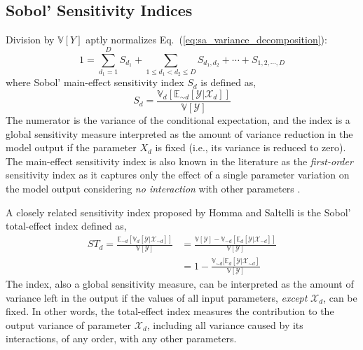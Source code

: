 \subsection{Sobol' Sensitivity Indices}\label{sub:sa_sobol_indices}

Division by $\mathbb{V}[Y]$ aptly normalizes Eq.~(\ref{eq:sa_variance_decomposition}):
\begin{equation}
  1 = \sum_{d_1 = 1}^{D} S_{d_1} + \sum_{1 \leq d_1 < d_2 \leq D} S_{d_1,d_2} + \cdots + S_{1,2,\cdots,D}
\label{eq:sa_normalized_variance}
\end{equation}
where Sobol' main-effect sensitivity index $S_d$ is defined as,
\begin{equation}
  S_d = \frac{\mathbb{V}_d [\mathbb{E}_{\sim d} [\mathcal{Y}|\mathcal{X}_d]]}{\mathbb{V}[\mathcal{Y}]}
\label{eq:sa_main_effect_index}
\end{equation}
The numerator is the variance of the conditional expectation,
and the index is a global sensitivity measure interpreted as the amount of variance reduction in the model output if the parameter $X_d$ is fixed (i.e., its variance is reduced to zero).
The main-effect sensitivity index is also known in the literature as the \emph{first-order} sensitivity index 
as it captures only the effect of a single parameter variation on the model output considering \emph{no interaction} with other parameters \cite{Saltelli2002}.

A closely related sensitivity index proposed by Homma and Saltelli \cite{Homma1996} is the Sobol' total-effect index defined as,
\begin{equation}
  \begin{split}
    ST_{d} = \frac{\mathbb{E}_{\sim d}[\mathbb{V}_{d}[\mathcal{Y}|\bm{\mathcal{X}}_{\sim d}]]}{\mathbb{V}[\mathcal{Y}]}
           & = \frac{\mathbb{V}[\mathcal{Y}] - \mathbb{V}_{\sim d}\left[\mathbb{E}_{d}\left[\mathcal{Y}|\bm{\mathcal{X}}_{\sim d}\right]\right]}{\mathbb{V}[\mathcal{Y}]} \\
           & = 1 - \frac{\mathbb{V}_{\sim d}[\mathbb{E}_{d}[\mathcal{Y}|\bm{\mathcal{X}}_{\sim d}]}{\mathbb{V}[\mathcal{Y}]}
  \end{split}
\label{eq:sa_total_effect_index}
\end{equation}
The index, also a global sensitivity measure, can be interpreted as the amount of variance left in the output if the values of all input parameters, \emph{except} $\mathcal{X}_d$, can be fixed.
In other words, the total-effect index measures the contribution to the output variance of parameter $\mathcal{X}_d$, including all variance caused by its interactions, of any order, with any other parameters.

